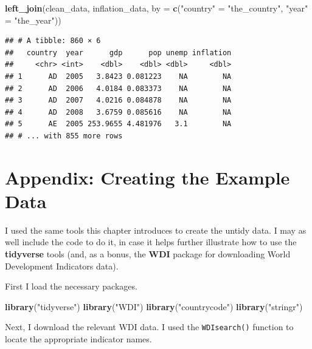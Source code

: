 \documentclass[12pt,oneside,openany]{book}
\newenvironment{Shaded}{\begin{snugshade}}{\end{snugshade}}
\newcommand{\KeywordTok}[1]{\textcolor[rgb]{0.13,0.29,0.53}{\textbf{#1}}}
\newcommand{\DataTypeTok}[1]{\textcolor[rgb]{0.13,0.29,0.53}{#1}}
\newcommand{\StringTok}[1]{\textcolor[rgb]{0.31,0.60,0.02}{#1}}
\newcommand{\NormalTok}[1]{#1}
\begin{document}
\begin{Shaded}
\begin{Highlighting}[]
\KeywordTok{left_join}\NormalTok{(clean_data,}
\NormalTok{          inflation_data,}
          \DataTypeTok{by =} \KeywordTok{c}\NormalTok{(}\StringTok{"country"}\NormalTok{ =}\StringTok{ "the_country"}\NormalTok{, }\StringTok{"year"}\NormalTok{ =}\StringTok{ "the_year"}\NormalTok{))}
\end{Highlighting}
\end{Shaded}

\begin{verbatim}
## # A tibble: 860 × 6
##   country  year      gdp      pop unemp inflation
##     <chr> <int>    <dbl>    <dbl> <dbl>     <dbl>
## 1      AD  2005   3.8423 0.081223    NA        NA
## 2      AD  2006   4.0184 0.083373    NA        NA
## 3      AD  2007   4.0216 0.084878    NA        NA
## 4      AD  2008   3.6759 0.085616    NA        NA
## 5      AE  2005 253.9655 4.481976   3.1        NA
## # ... with 855 more rows
\end{verbatim}

\section{Appendix: Creating the Example
Data}\label{appendix-creating-the-example-data}

I used the same tools this chapter introduces to create the untidy data.
I may as well include the code to do it, in case it helps further
illustrate how to use the \textbf{tidyverse} tools (and, as a bonus, the
\textbf{WDI} package for downloading World Development Indicators data).

First I load the necessary packages.

\begin{Shaded}
\begin{Highlighting}[]
\KeywordTok{library}\NormalTok{(}\StringTok{"tidyverse"}\NormalTok{)}
\KeywordTok{library}\NormalTok{(}\StringTok{"WDI"}\NormalTok{)}
\KeywordTok{library}\NormalTok{(}\StringTok{"countrycode"}\NormalTok{)}
\KeywordTok{library}\NormalTok{(}\StringTok{"stringr"}\NormalTok{)}
\end{Highlighting}
\end{Shaded}

Next, I download the relevant WDI data. I used the \texttt{WDIsearch()}
function to locate the appropriate indicator names.
\end{document}
